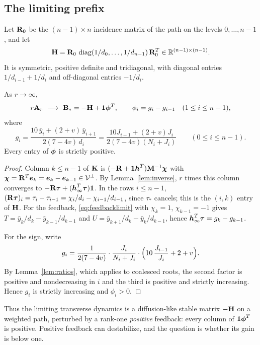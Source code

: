 \subsection{The limiting prefix}
Let \(\mathbf R_0\) be the \((n-1)\times n\) incidence matrix of the path on the levels
\(0,\dots,n-1\), and let
\begin{equation}\label{eq:pathH}
 \mathbf H=\mathbf R_0\,\operatorname{diag}(1/d_0,\dots,1/d_{n-1})\,\mathbf R_0^{T}\in\mathbb R^{(n-1)\times(n-1)} .
\end{equation}
It is symmetric, positive definite and tridiagonal, with diagonal entries
\(1/d_{i-1}+1/d_i\) and off-diagonal entries \(-1/d_i\).

\begin{lemma}\label{lem:prefixlimit}
As \(r\to\infty\),
\begin{equation}\label{eq:Bstar}
 r\mathbf A_r\ \longrightarrow\ \mathbf B_*=-\mathbf H+\boldsymbol 1\boldsymbol\phi^{T},\qquad
 \phi_i=g_i-g_{i-1}\quad(1\le i\le n-1),
\end{equation}
where
\begin{equation}\label{eq:gi}
 g_i=\frac{10\,\bar y_i+(2+v)\,\bar y_{i+1}}{2(7-4v)\,d_i}
 =\frac{10J_{i-1}+(2+v)J_i}{2(7-4v)(N_i+J_i)}\qquad(0\le i\le n-1).
\end{equation}
Every entry of \(\boldsymbol\phi\) is strictly positive.
\end{lemma}
\begin{proof}
Column \(k\le n-1\) of \(\mathbf K\) is \((-\mathbf R+\boldsymbol 1\boldsymbol h^{T})\mathbf M^{-1}\boldsymbol\chi\) with
\(\boldsymbol\chi=\mathbf R^{T}\boldsymbol e_k=\boldsymbol e_k-\boldsymbol e_{k-1}\in\mathcal V^{\perp}\). By Lemma~\ref{lem:inverse}, \(r\)
times this column converges to \(-\mathbf R\boldsymbol\tau+(\boldsymbol h_\infty^{T}\boldsymbol\tau)\boldsymbol 1\). In the rows
\(i\le n-1\), \((\mathbf R\boldsymbol\tau)_i=\tau_i-\tau_{i-1}=\chi_i/d_i-\chi_{i-1}/d_{i-1}\), since
\(\tau_\ast\) cancels; this is the \((i,k)\) entry of \(\mathbf H\). For the feedback,
\eqref{eq:feedbacklimit} with \(\chi_k=1\), \(\chi_{k-1}=-1\) gives
\(T=\bar y_k/d_k-\bar y_{k-1}/d_{k-1}\) and \(U=\bar y_{k+1}/d_k-\bar y_k/d_{k-1}\), hence
\(\boldsymbol h_\infty^{T}\boldsymbol\tau=g_k-g_{k-1}\).

For the sign, write
\[
 g_i=\frac{1}{2(7-4v)}\cdot\frac{J_i}{N_i+J_i}\cdot\Bigl(10\,\frac{J_{i-1}}{J_i}+2+v\Bigr).
\]
By Lemma~\ref{lem:ratios}, which applies to coalesced roots, the second factor is positive and
nondecreasing in \(i\) and the third is positive and strictly increasing. Hence \(g_i\) is
strictly increasing and \(\phi_i>0\).
\end{proof}

Thus the limiting transverse dynamics is a diffusion-like stable matrix \(-\mathbf H\) on a weighted
path, perturbed by a rank-one \emph{positive} feedback: every column of \(\boldsymbol 1\boldsymbol\phi^{T}\) is
positive. Positive feedback can destabilize, and the question is whether its gain is below
one.


